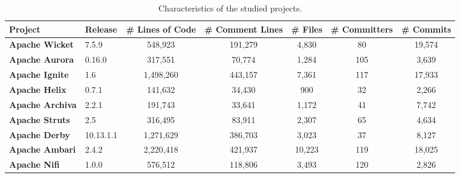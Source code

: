 \begin{landscape}

	
	
	\begin{table}[htbp]
		\small
		\centering
		\caption{Characteristics of the studied projects.}
		\begin{adjustbox}{width=1.3\textwidth}
			
			
			\begin{tabular}{l|l|c|c|c|c|c}
				\hline
				\textbf{Project}           & \textbf{Release} & \textbf{\# Lines of Code} & \textbf{\# Comment Lines} & \textbf{\# Files} & \textbf{\# Committers} & \textbf{\# Commits} \\ \hline
				\textbf{Apache Wicket}     & 7.5.9            & 548,923                    &          191,279           &       4,830        &           80           &        19,574        \\ \hline
				\textbf{Apache Aurora}     & 0.16.0           & 317,551                    &           70,774           &       1,284        &          105           &        3,639         \\ \hline
				\textbf{Apache Ignite}     & 1.6              & 1,498,260                   &          443,157           &       7,361        &          117           &        17,933        \\ \hline
				\textbf{Apache Helix}      & 0.7.1            & 141,632                    &           34,430           &        900        &           32           &        2,266         \\ \hline
				\textbf{Apache Archiva}    & 2.2.1            & 191,743                    &           33,641           &       1,172        &           41           &        7,742         \\ \hline
				\textbf{Apache Struts}     & 2.5              & 316,495                    &           83,911           &       2,307        &           65           &        4,634         \\ \hline
				\textbf{Apache Derby}      & 10.13.1.1        & 1,271,629                   &          386,703           &       3,023        &           37           &        8,127         \\ \hline
				\textbf{Apache Ambari}     & ‎2.4.2           & 2,220,418                   &          421,937           &       10,223       &          119           &        18,025        \\ \hline
				\textbf{Apache Nifi}       & 1.0.0            & 576,512                    &          118,806           &       3,493        &          120           &        2,826         \\ \hline

\end{tabular}
\end{adjustbox}
\end{table}
\end{landscape}
